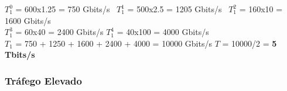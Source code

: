 \vspace{17pt}


$T_1^0$ = 600x1.25 = 750 Gbits/s \  $T_1^1$ = 500x2.5 = 1205 Gbits/s \  $T_1^2$ = 160x10 = 1600 Gbits/s \\

$T_1^3$ = 60x40 = 2400 Gbits/s \quad
$T_1^4$ = 40x100 = 4000 Gbits/s \\

$T_{1}$ = 750 + 1250 + 1600 + 2400 + 4000 = 10000 Gbits/s \qquad
$T$ = 10000/2 = \textbf{5 Tbits/s}\\



\subsubsection{Tráfego Elevado}
\label{high}

